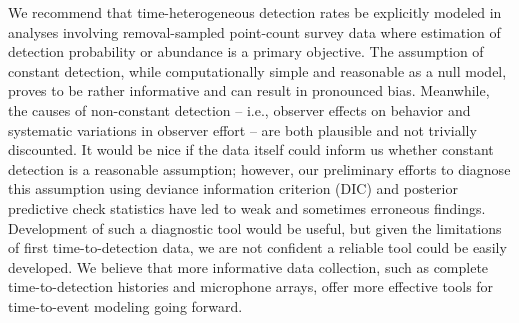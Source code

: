 \documentclass[12pt]{article}
\newcommand{\pdet}{p^{(det)}}
\begin{document}
We recommend that time-heterogeneous detection rates be explicitly modeled in analyses involving removal-sampled point-count survey data where estimation of detection probability or abundance is a primary objective.  
The assumption of constant detection, while computationally simple and reasonable as a null model, proves to be rather informative and can result in pronounced bias.  
Meanwhile, the causes of non-constant detection -- i.e., observer effects on behavior and systematic variations in observer effort -- are both plausible and not trivially discounted.  
It would be nice if the data itself could inform us whether constant detection is a reasonable assumption; however, our preliminary efforts to diagnose this assumption using deviance information criterion (DIC) and posterior predictive check statistics have led to weak and sometimes erroneous findings.
Development of such a diagnostic tool would be useful, but given the limitations of first time-to-detection data, we are not confident a reliable tool could be easily developed.  
We believe that more informative data collection, such as complete time-to-detection histories and microphone arrays, offer more effective tools for time-to-event modeling going forward.








\end{document}
